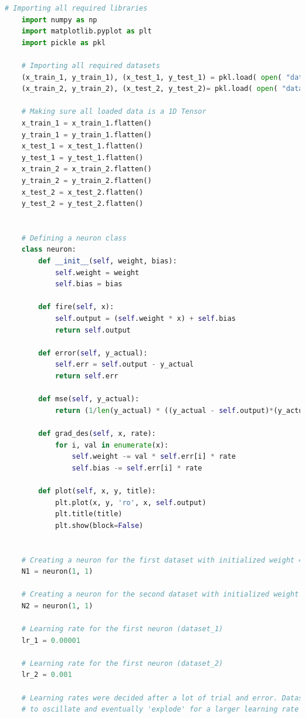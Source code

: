 \documentclass[a4paper, 12pt]{article}
\begin{document}
    \begin{lstlisting}[language=python, caption=Initialization Code (Cell 1)]
    # Importing all required libraries
    import numpy as np
    import matplotlib.pyplot as plt
    import pickle as pkl

    # Importing all required datasets
    (x_train_1, y_train_1), (x_test_1, y_test_1) = pkl.load( open( "dataset.pkl", "rb" ) )
    (x_train_2, y_train_2), (x_test_2, y_test_2)= pkl.load( open( "dataset2.pkl", "rb" ) )

    # Making sure all loaded data is a 1D Tensor
    x_train_1 = x_train_1.flatten()
    y_train_1 = y_train_1.flatten()
    x_test_1 = x_test_1.flatten()
    y_test_1 = y_test_1.flatten()
    x_train_2 = x_train_2.flatten()
    y_train_2 = y_train_2.flatten()
    x_test_2 = x_test_2.flatten()
    y_test_2 = y_test_2.flatten()


    # Defining a neuron class
    class neuron:
        def __init__(self, weight, bias):
            self.weight = weight
            self.bias = bias
        
        def fire(self, x):
            self.output = (self.weight * x) + self.bias
            return self.output
        
        def error(self, y_actual):
            self.err = self.output - y_actual
            return self.err
        
        def mse(self, y_actual):
            return (1/len(y_actual) * ((y_actual - self.output)*(y_actual - self.output)).sum())
            
        def grad_des(self, x, rate):
            for i, val in enumerate(x):
                self.weight -= val * self.err[i] * rate
                self.bias -= self.err[i] * rate
            
        def plot(self, x, y, title):
            plt.plot(x, y, 'ro', x, self.output)
            plt.title(title)
            plt.show(block=False)
            

    # Creating a neuron for the first dataset with initialized weight = bias = 1
    N1 = neuron(1, 1)

    # Creating a neuron for the second dataset with initialized weight = bias = 1
    N2 = neuron(1, 1)

    # Learning rate for the first neuron (dataset_1)
    lr_1 = 0.00001

    # Learning rate for the first neuron (dataset_2)
    lr_2 = 0.001

    # Learning rates were decided after a lot of trial and error. Dataset 1 tends
    # to oscillate and eventually 'explode' for a larger learning rate than the one used.\end{lstlisting}
\end{document}
